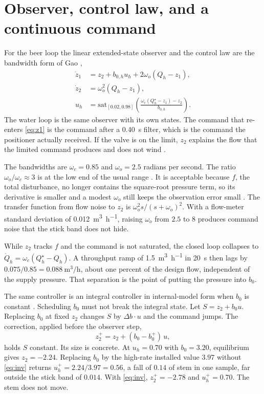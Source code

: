 \documentclass[conference,a4paper]{IEEEtran}
\begin{document}
\section{Observer, control law, and a continuous command}
For the beer loop the linear extended-state observer and the control law are the bandwidth form of Gao \cite{gao2003scaling,fu2016tuning},
\begin{align}
\dot{z}_1 &= z_2 + b_{0,h} u_h + 2\omega_o(Q_h-z_1), \label{eq:z1}\\
\dot{z}_2 &= \omega_o^2(Q_h-z_1), \label{eq:z2}\\
u_h &= \mathrm{sat}_{[0.02,0.98]}\!\left(\frac{\omega_c(Q_h^\star-z_1)-z_2}{b_{0,h}}\right). \label{eq:u}
\end{align}
The water loop is the same observer with its own states. The command that re-enters \eqref{eq:z1} is the command after a \SI{0.40}{s} filter, which is the command the positioner actually received. If the valve is on the limit, $z_2$ explains the flow that the limited command produces and does not wind \cite{han2009pid,astrom2006advanced}.

The bandwidths are $\omega_c=0.85$ and $\omega_o=2.5$ radians per second. The ratio $\omega_o/\omega_c\approx 3$ is at the low end of the usual range \cite{gao2003scaling,herbst2013simulative}. It is acceptable because $f$, the total disturbance, no longer contains the square-root pressure term, so its derivative is smaller and a modest $\omega_o$ still keeps the observation error small \cite{guo2011convergence,huang2014methodology}. The transfer function from flow noise to $z_2$ is $\omega_o^2 s/(s+\omega_o)^2$. With a flow-meter standard deviation of \SI{0.012}{\cubic\metre\per\hour}, raising $\omega_o$ from $2.5$ to $8$ produces command noise that the stick band does not hide.

While $z_2$ tracks $f$ and the command is not saturated, the closed loop collapses to $\dot{Q}_h=\omega_c(Q_h^\star-Q_h)$. A throughput ramp of \SI{1.5}{\cubic\metre\per\hour} in \SI{20}{s} then lags by $0.075/0.85=\SI{0.088}{\cubic\metre\per\hour}$, about one percent of the design flow, independent of the supply pressure. That separation is the point of putting the pressure into $b_0$.

The same controller is an integral controller in internal-model form when $b_0$ is constant \cite{tan2016imc}. Scheduling $b_0$ must not break the integral state. Let $S=z_2+b_0 u$. Replacing $b_0$ at fixed $z_2$ changes $S$ by $\Delta b\cdot u$ and the command jumps. The correction, applied before the observer step,
\begin{equation}
\label{eq:inv}
z_2^+ = z_2 + (b_0-b_0^+)\,u,
\end{equation}
holds $S$ constant. Its size is concrete. At $u_h=0.70$ with $b_0=3.20$, equilibrium gives $z_2=-2.24$. Replacing $b_0$ by the high-rate installed value $3.97$ without \eqref{eq:inv} returns $u_h^+=2.24/3.97=0.56$, a fall of $0.14$ of stem in one sample, far outside the stick band of $0.014$. With \eqref{eq:inv}, $z_2^+=-2.78$ and $u_h^+=0.70$. The stem does not move.
\end{document}
